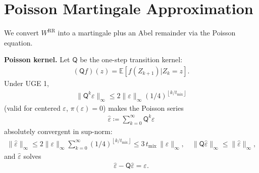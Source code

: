 
\section{Poisson Martingale Approximation}

We convert \(W^{\text{RR}}\) into a martingale plus an Abel remainder via the
Poisson equation.

\textbf{Poisson kernel.} Let \(\mathsf{Q}\) be the one-step transition kernel:
\begin{equation}
\begin{aligned}
(\mathsf{Q} f)(z) = \mathbb{E} \left[f(Z_{k + 1}) | Z_k = z\right].
\end{aligned}
\end{equation}
Under UGE 1,
\begin{equation}
\begin{aligned}
\lVert  \mathsf{Q}^k \varepsilon  \rVert_\infty \le 2 \lVert  \varepsilon  \rVert_\infty (1 / 4)^{\left\lfloor k / t_{\text{mix}} \right\rfloor}
\end{aligned}
\end{equation}
(valid for centered \(\varepsilon\), \(\pi(\varepsilon) = 0\)) makes the Poisson
series
\begin{equation}
\begin{aligned}
\widehat{\varepsilon} \coloneqq \sum_{k = 0}^\infty \mathsf{Q}^k \varepsilon
\end{aligned}
\end{equation}
absolutely convergent in sup-norm:
\begin{equation}
\begin{aligned}
\lVert  \widehat{\varepsilon}  \rVert_\infty
  \le 2 \lVert  \varepsilon  \rVert_\infty \sum_{k = 0}^\infty (1 / 4)^{\left\lfloor k / t_{\text{mix}} \right\rfloor}
  \le 3 \, t_{\text{mix}} \, \lVert  \varepsilon  \rVert_\infty,
\quad
\lVert  \mathsf{Q} \widehat{\varepsilon}  \rVert_\infty
  \le \lVert  \widehat{\varepsilon}  \rVert_\infty,
\end{aligned}
\end{equation}
and \(\widehat{\varepsilon}\) solves
\begin{equation}
\begin{aligned}
\widehat{\varepsilon} - \mathsf{Q} \widehat{\varepsilon} = \varepsilon.
\end{aligned}
\label{eq:poisson-eq}
\end{equation}

